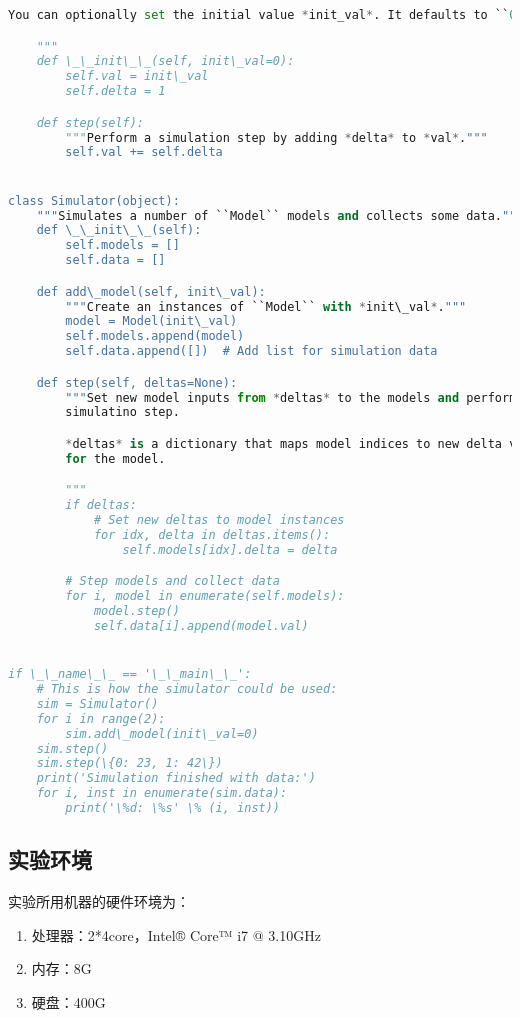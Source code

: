 \begin{enumerate}
\begin{lstlisting}[language={Python}, caption={示例模拟器实现}]
    You can optionally set the initial value *init_val*. It defaults to ``0``.

    """
    def \_\_init\_\_(self, init\_val=0):
        self.val = init\_val
        self.delta = 1

    def step(self):
        """Perform a simulation step by adding *delta* to *val*."""
        self.val += self.delta


class Simulator(object):
    """Simulates a number of ``Model`` models and collects some data."""
    def \_\_init\_\_(self):
        self.models = []
        self.data = []

    def add\_model(self, init\_val):
        """Create an instances of ``Model`` with *init\_val*."""
        model = Model(init\_val)
        self.models.append(model)
        self.data.append([])  # Add list for simulation data

    def step(self, deltas=None):
        """Set new model inputs from *deltas* to the models and perform a
        simulatino step.

        *deltas* is a dictionary that maps model indices to new delta values
        for the model.

        """
        if deltas:
            # Set new deltas to model instances
            for idx, delta in deltas.items():
                self.models[idx].delta = delta

        # Step models and collect data
        for i, model in enumerate(self.models):
            model.step()
            self.data[i].append(model.val)


if \_\_name\_\_ == '\_\_main\_\_':
    # This is how the simulator could be used:
    sim = Simulator()
    for i in range(2):
        sim.add\_model(init\_val=0)
    sim.step()
    sim.step(\{0: 23, 1: 42\})
    print('Simulation finished with data:')
    for i, inst in enumerate(sim.data):
        print('\%d: \%s' \% (i, inst))

\end{lstlisting}
 
\end{enumerate}

\subsection{实验环境}

实验所用机器的硬件环境为：
\begin{enumerate}
\item 处理器：2*4core，Intel® Core™ i7 @ 3.10GHz
\item 内存：8G
\item 硬盘：400G
\end{enumerate}


